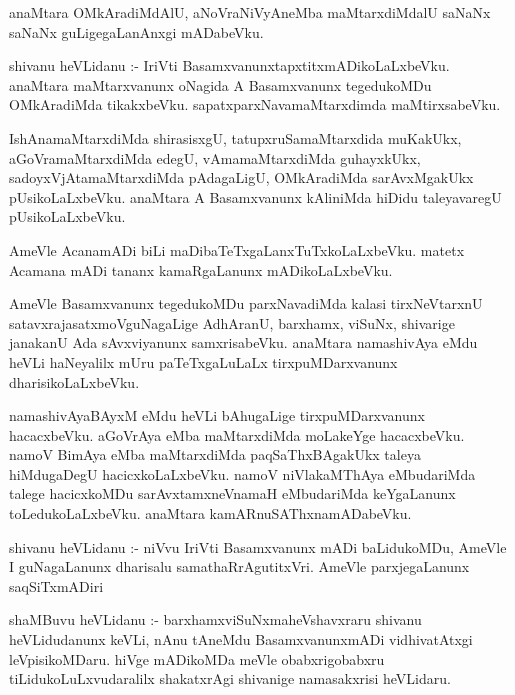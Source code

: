 \documentclass{article}
\begin{document}
\begin{mn}
anaMtara  OMkAradiMdAlU,  aNoVraNiVyAneMba  maMtarxdiMdalU  saNaNx saNaNx  guLigegaLanAnxgi  mADabeVku.
\end{mn}

\begin{mn}
shivanu  heVLidanu :- IriVti  BasamxvanunxtapxtitxmADikoLaLxbeVku.  anaMtara  maMtarxvanunx  oNagida  A  
Basamxvanunx  tegedukoMDu  OMkAradiMda  tikakxbeVku.  sapatxparxNavamaMtarxdimda  maMtirxsabeVku.
\end{mn}

\begin{mn}
IshAnamaMtarxdiMda  shirasisxgU,  tatupxruSamaMtarxdida  muKakUkx,  aGoVramaMtarxdiMda  edegU,  
vAmamaMtarxdiMda  guhayxkUkx,  sadoyxVjAtamaMtarxdiMda  pAdagaLigU,  OMkAradiMda  sarAvxMgakUkx  
pUsikoLaLxbeVku.  anaMtara  A  Basamxvanunx  kAliniMda  hiDidu  taleyavaregU  pUsikoLaLxbeVku.
\end{mn}

\begin{mn}
AmeVle  AcanamADi  biLi  maDibaTeTxgaLanxTuTxkoLaLxbeVku.  matetx  Acamana  mADi  tananx  kamaRgaLanunx  mADikoLaLxbeVku.
\end{mn}

\begin{mn}
AmeVle  Basamxvanunx  tegedukoMDu  parxNavadiMda  kalasi  tirxNeVtarxnU  satavxrajasatxmoVguNagaLige  
AdhAranU,  barxhamx,  viSuNx,  shivarige  janakanU  Ada  sAvxviyanunx  samxrisabeVku.  anaMtara  
namashivAya  eMdu  heVLi  haNeyalilx  mUru  paTeTxgaLuLaLx  tirxpuMDarxvanunx  dharisikoLaLxbeVku.
\end{mn}

\begin{mn}
namashivAyaBAyxM  eMdu heVLi  bAhugaLige  tirxpuMDarxvanunx  hacacxbeVku.  aGoVrAya  eMba  maMtarxdiMda  
moLakeYge  hacacxbeVku.  namoV BimAya  eMba  maMtarxdiMda  paqSaThxBAgakUkx  taleya  hiMdugaDegU  
hacicxkoLaLxbeVku.  namoV  niVlakaMThAya  eMbudariMda  talege  hacicxkoMDu  sarAvxtamxneVnamaH  
eMbudariMda  keYgaLanunx  toLedukoLaLxbeVku.  anaMtara  kamARnuSAThxnamADabeVku.
\end{mn}

\begin{mn}
shivanu  heVLidanu :- niVvu  IriVti  Basamxvanunx  mADi  baLidukoMDu,  AmeVle  I  guNagaLanunx  dharisalu  
samathaRrAgutitxVri.  AmeVle  parxjegaLanunx  saqSiTxmADiri
\end{mn}

\begin{mn}
shaMBuvu  heVLidanu :- barxhamxviSuNxmaheVshavxraru  shivanu  heVLidudanunx  keVLi,  nAnu  tAneMdu  
BasamxvanunxmADi  vidhivatAtxgi  leVpisikoMDaru.  hiVge  mADikoMDa  meVle  obabxrigobabxru  
tiLidukoLuLxvudaralilx  shakatxrAgi  shivanige  namasakxrisi  heVLidaru.
\end{mn}
\end{document}
